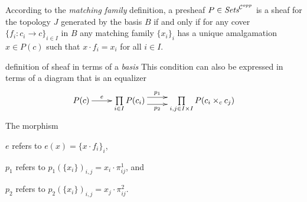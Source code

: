 \begin{frame}
According to the {\it matching family} definition, a presheaf $P \in \textit{Sets}^{{\mathcal C}^{opp}}$ is a sheaf for the topology $J$ generated by the basis $B$ if and only if for any cover $\{ f_i : c_i \rightarrow c \}_{i \in I}$ in $B$ any matching family $\{ x_i \}_i$ has a unique amalgamation $x \in P(c)$ such that $x \cdot f_i = x_i$ for all $i \in I$. 
\begin{block}{definition of sheaf in terms of a {\it basis}}
This condition can also be expressed in terms of a diagram that is an equalizer
\begin{displaymath}
\xymatrix{
P(c) \ar[r]^-{e}
&
\prod\limits_{i \in I}
P(c_i)
\ar@<1ex>[r]^-{p_1} \ar@<-1ex>[r]_-{p_2}
&
\prod\limits_{i,j \in I \times I} P(c_i \times_c c_j)
}
\end{displaymath}
\noindent The morphism 

$e$ refers to $e(x) = \{ x \cdot f_i \}_i$, 

$p_1$ refers to $p_1(\{ x_i \})_{i,j} = x_i \cdot \pi_{ij}^1$, and 

$p_2$ refers to $p_2(\{x_i\})_{i,j} = x_j \cdot \pi_{ij}^{2}$.
\end{block}
\end{frame}